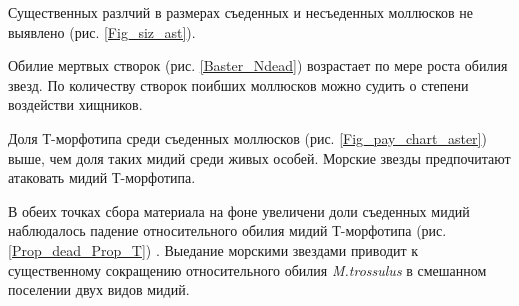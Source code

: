 \documentclass[20pt,a0,portrait]{a0poster}
\begin{document}
\begin{minipage}[t]{0.46\linewidth}
\begin{minipage}[t]{0.46\linewidth}
\begin{center}
			\label{Prop_dead_Prop_T}
		\end{center}
\end{minipage}\vspace{0.5cm}

\vspace{\belowdisplayskip}


Существенных разлчий в размерах съеденных и несъеденных моллюсков не выявлено (рис. \ref{Fig_siz_ast}). 

Обилие мертвых створок (рис. \ref{Baster_Ndead}) возрастает по мере роста обилия звезд. По количеству створок поибших моллюсков можно судить о степени воздействи хищников.  

Доля Т-морфотипа среди съеденных моллюсков (рис.  \ref{Fig_pay_chart_aster}) выше, чем доля таких мидий среди живых особей. Морские звезды предпочитают атаковать мидий Т-морфотипа. 

В обеих точках сбора материала на фоне увеличени доли съеденных мидий наблюдалось падение относительного обилия мидий Т-морфотипа (рис. \ref{Prop_dead_Prop_T}) . Выедание морскими звездами приводит к существенному сокращению относительного обилия \emph{M.trossulus} в смешанном поселении двух видов мидий.

\end{minipage}\vspace{1cm}
%
\end{document}
